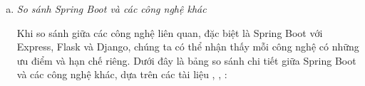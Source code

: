 \begin{enumerate}[(a)]


        \item \textit{So sánh Spring Boot và các công nghệ khác}

            Khi so sánh giữa các công nghệ liên quan, đặc biệt là Spring Boot với Express, Flask và Django, chúng ta có thể nhận thấy mỗi công nghệ có những ưu điểm và hạn chế riêng. Dưới đây là bảng so sánh chi tiết giữa Spring Boot và các công nghệ khác, dựa trên các tài liệu \cite{BackCompare1}, \cite{BackCompare2}, \cite{BackCompare3}:
            

\end{enumerate}
